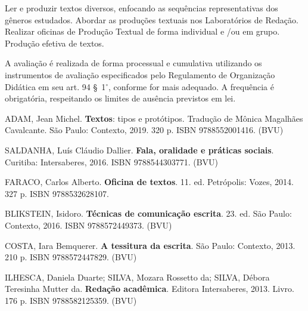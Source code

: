 \begin{pud}
	\metodologia	
	Ler e produzir textos diversos, enfocando as sequências representativas dos gêneros estudados. Abordar as produções textuais nos Laboratórios de Redação. Realizar oficinas de Produção Textual de forma individual e /ou em grupo. Produção efetiva de textos.
	
	\avaliacao	
	A avaliação é realizada de forma processual e cumulativa utilizando os instrumentos de avaliação especificados pelo Regulamento de Organização Didática em seu art. 94 \S~1$^\circ$, conforme for mais adequado. A frequência é obrigatória, respeitando os limites de ausência previstos em lei.
	
	\begin{bibbasica}
	
		\item ADAM, Jean Michel. \textbf{Textos}: tipos e protótipos. Tradução de Mônica Magalhães Cavalcante.  São Paulo: Contexto, 2019. 320 p. ISBN 9788552001416. (BVU)
        \item SALDANHA, Luís Cláudio Dallier. \textbf{Fala, oralidade e práticas sociais}. Curitiba: Intersaberes, 2016.  ISBN 9788544303771. (BVU)
        \item FARACO, Carlos Alberto. \textbf{Oficina de textos}. 11. ed. Petrópolis: Vozes, 2014. 327 p. ISBN 9788532628107.

	\end{bibbasica}
	
	\begin{bibcomplementar}
	
            \item BLIKSTEIN, Isidoro. \textbf{Técnicas de comunicação escrita}. 23. ed. São Paulo: Contexto, 2016. ISBN 9788572449373.  (BVU)
            \item COSTA, Iara Bemquerer. \textbf{A tessitura da escrita}. São Paulo: Contexto, 2013. 210 p. ISBN 9788572447829.  (BVU)
            
            \item ILHESCA, Daniela Duarte; SILVA, Mozara Rossetto da; SILVA, Débora Teresinha Mutter da. \textbf{Redação acadêmica}. Editora Intersaberes, 2013. Livro.  176 p. ISBN 9788582125359. (BVU)
            

\end{bibcomplementar}
\end{pud}
